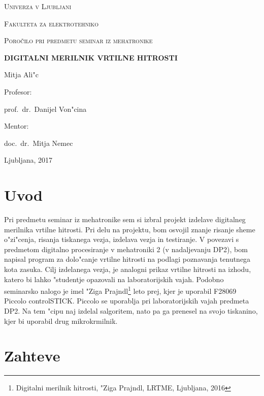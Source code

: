 \documentclass[a4paper]{article}
\begin{document}
\begin{titlepage}
	\centering

	{\scshape\LARGE Univerza v Ljubljani \par}
	{\scshape\large Fakulteta za elektrotehniko \par}
	\vspace{3cm}
	{\scshape\Large Poro\v cilo pri predmetu seminar iz mehatronike\par}
	\vspace{1.5cm}
	{\huge\bfseries DIGITALNI MERILNIK VRTILNE HITROSTI\par}
	\vspace{2cm}
	{\Large Mitja Ali"c\par}
	\vspace{0.5cm}
	Profesor:\par
	prof.~dr.~Danijel Von"cina\par
		\vspace{0.25cm}
	Mentor:\par
	doc.~dr.~Mitja Nemec\par
	

	\vfill

	{\large Ljubljana, 2017\par}
\end{titlepage}


\tableofcontents

\newpage

\section{Uvod}
Pri predmetu seminar iz mehatronike sem si izbral projekt izdelave digitalneg merilnika vrtilne hitrosti. Pri delu na projektu, bom osvojil znanje risanje sheme o"zi"cenja, risanja tiskanega vezja, izdelava vezja in testiranje. V povezavi s predmetom digitalno procesiranje v mehatroniki 2 (v nadaljevanju DP2), bom napisal program za dolo"canje vrtilne hitrosti na podlagi poznavanja tenutnega kota zasuka. Cilj izdelanega vezja, je analogni prikaz vrtilne hitrosti na izhodu, katero bi lahko "studentje opazovali na laboratorijskih vajah. Podobno seminarsko nalogo je imel "Ziga Prajndl\footnote{Digitalni merilnik hitrosti, "Ziga Prajndl, LRTME, Ljubljana, 2016} leto prej, kjer je uporabil F28069 Piccolo controlSTICK. Piccolo se uporablja pri laboratorijskih vajah predmeta DP2. Na tem "cipu naj izdelal salgoritem, nato pa ga prenesel na svojo tiskanino, kjer bi uporabil drug mikrokrmilnik.

\section{Zahteve}
\end{document}
